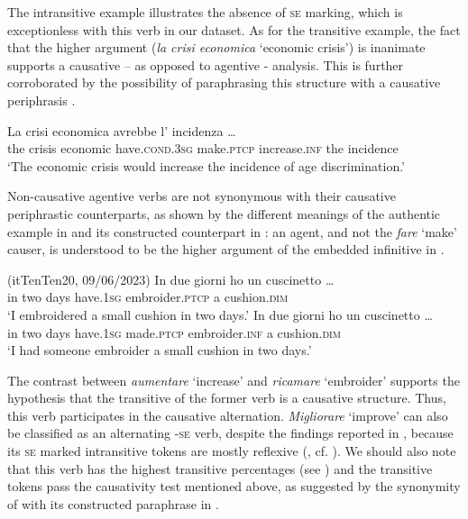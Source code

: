 \documentclass[output=paper,colorlinks,citecolor=brown
]{langscibook}
\begin{document}
The intransitive example illustrates the absence of \textsc{se} marking, which is exceptionless with this verb in our dataset. As for the transitive example, the fact that the higher argument (\textit{la crisi economica} ‘economic crisis’) is inanimate supports a causative – as opposed to agentive - analysis. This is further corroborated by the possibility of paraphrasing this structure with a causative periphrasis \citep[26--27 and references therein]{zribi1987reflexivite}.

\ea \label{bentley_example_10}
    \gll La	crisi		economica	avrebbe 							  l’ {incidenza \ldots }\\
    				the	crisis	economic		have.\textsc{cond}.3\textsc{sg}	make.\textsc{ptcp}	increase.\textsc{inf}	the incidence\\
    \glt  	‘The economic crisis would increase the incidence of age discrimination.’
\z

Non-causative agentive verbs are not synonymous with their causative periphrastic counterparts, as shown by the different meanings of the authentic example in  and its constructed counterpart in : an agent, and not the \textit{fare} ‘make’ causer, is understood to be the higher argument of the embedded infinitive in .

\ea (itTenTen20, 09/06/2023)\label{bentley_example_11}
    \ea \label{bentley_example_11a}
    \gll In	due	giorni	ho												un cuscinetto \ldots  \\
    in	two	days			have.1\textsc{sg}	embroider.\textsc{ptcp}	a			cushion.\textsc{dim}\\
    \glt ‘I embroidered a small cushion in two days.’
    \ex \label{bentley_example_11b}
    \gll In	due	giorni	ho																	un	cuscinetto \ldots  \\
   	in	two	days			have.1\textsc{sg}	made.\textsc{ptcp}	embroider.\textsc{inf}		a			cushion.\textsc{dim} \\
    \glt ‘I had someone embroider a small cushion in two days.’
    \z
\z

The contrast between \textit{aumentare} ‘increase’ and \textit{ricamare} ‘embroider’ supports the hypothesis that the transitive of the former verb is a causative structure. Thus, this verb participates in the causative alternation. 
\textit{Migliorare} ‘improve’ can also be classified as an alternating -\textsc{se} verb, despite the findings reported in , because its \textsc{se} marked intransitive tokens are mostly reflexive (, cf. ). We should also note that this verb has the highest transitive percentages (see ) and the transitive tokens pass the causativity test mentioned above, as suggested by the synonymity of  with its constructed paraphrase in .
\end{document}
